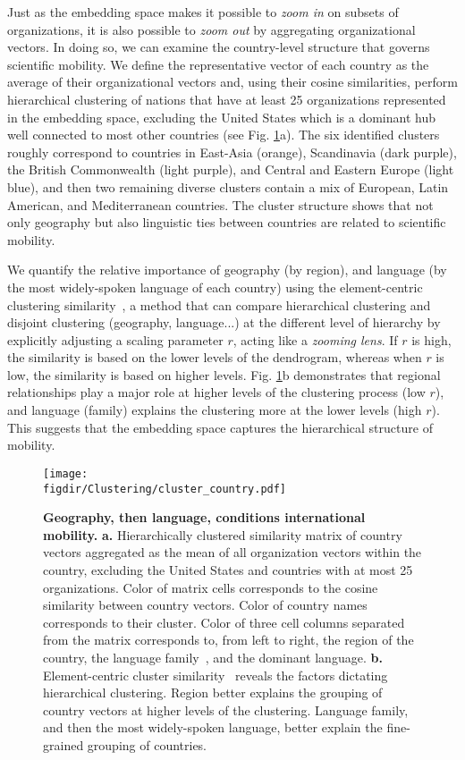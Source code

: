\documentclass[12pt]{article} %
\def\figdir{../Figs}
\begin{document}
Just as the embedding space makes it possible to \textit{zoom in} on subsets of organizations, it is also possible to \textit{zoom out} by aggregating organizational vectors.
In doing so, we can examine the country-level structure that governs scientific mobility.
We define the representative vector of each country as the average of their organizational vectors and, using their cosine similarities, perform hierarchical clustering of nations that have at least 25 organizations represented in the embedding space, excluding the United States which is a dominant hub well connected to most other countries (see Fig. \ref{fig:clustering}a).
The six identified clusters roughly correspond to countries in East-Asia (orange), Scandinavia (dark purple), the British Commonwealth (light purple), and Central and Eastern Europe (light blue), and then two remaining diverse clusters contain a mix of European, Latin American, and Mediterranean countries.
The cluster structure shows that not only geography but also linguistic ties between countries are related to scientific mobility.

We quantify the relative importance of geography (by region), and language (by the most widely-spoken language of each country) using the element-centric clustering similarity~\autocite{gates2019element}, a method that can compare hierarchical clustering and disjoint clustering (geography, language...) at the different level of hierarchy by explicitly adjusting a scaling parameter $r$, acting like a \textit{zooming lens}.
If $r$ is high, the similarity is based on the lower levels of the dendrogram, whereas when $r$ is low, the similarity is based on higher levels.
Fig. \ref{fig:clustering}b demonstrates that regional relationships play a major role at higher levels of the clustering process (low $r$), and language (family) explains the clustering more at the lower levels (high $r$).
This suggests that the embedding space captures the hierarchical structure of mobility.


%
%
\begin{figure}[p!]
	\centering
	\texttt{[image: \\figdir/Clustering/cluster\_country.pdf]}
	\caption{
		\textbf{Geography, then language, conditions international mobility.}
		\textbf{a.} Hierarchically clustered similarity matrix of country vectors aggregated as the mean of all organization vectors within the country, excluding the United States and countries with at most 25 organizations.
		Color of matrix cells corresponds to the cosine similarity between country vectors.
		Color of country names corresponds to their cluster.
		Color of three cell columns separated from the matrix corresponds to, from left to right, the region of the country, the language family~\autocite{ethnologue}, and the dominant language.
		\textbf{b.}	Element-centric cluster similarity~\autocite{gates2019element} reveals the factors dictating hierarchical clustering.
		Region better explains the grouping of country vectors at higher levels of the clustering.
		Language family, and then the most widely-spoken language, better explain the fine-grained grouping of countries.
	}
	\label{fig:clustering}
\end{figure}
\end{document}
